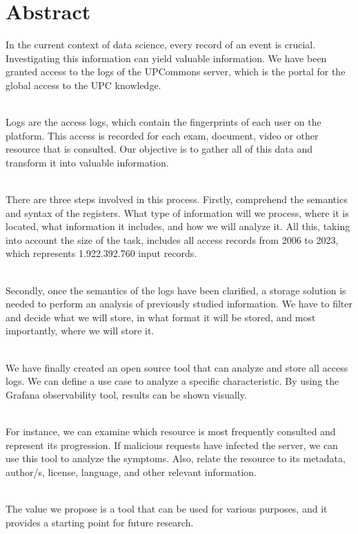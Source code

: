 \chapter*{Abstract}\label{ch:abstract-en}

In the current context of data science, every record of an event is crucial.
Investigating this information can yield valuable information.
We have been granted access to the logs of the UPCommons server, which is the portal for the global access to the UPC knowledge.

\noindent \\
Logs are the access logs, which contain the fingerprints of each user on the platform.
This access is recorded for each exam, document, video or other resource that is consulted.
Our objective is to gather all of this data and transform it into valuable information.

\noindent \\
There are three steps involved in this process.
Firstly, comprehend the semantics and syntax of the registers.
What type of information will we process, where it is located, what information it includes, and how we will analyze it.
All this, taking into account the size of the task, includes all access records from 2006 to 2023, which represents 1.922.392.760 input records.

\noindent \\
Secondly, once the semantics of the logs have been clarified, a storage solution is needed to perform an analysis of previously studied information.
We have to filter and decide what we will store, in what format it will be stored, and most importantly, where we will store it.

\noindent \\
We have finally created an open source tool that can analyze and store all access logs.
We can define a use case to analyze a specific characteristic.
By using the Grafana observability tool, results can be shown visually.

\noindent \\
For instance, we can examine which resource is most frequently consulted and represent its progression.
If malicious requests have infected the server, we can use this tool to analyze the symptoms.
Also, relate the resource to its metadata, author/s, license, language, and other relevant information.

\noindent \\
The value we propose is a tool that can be used for various purposes, and it provides a starting point for future research.


